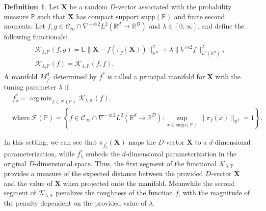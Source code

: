 \documentclass[11pt,reqno]{article}
\DeclareMathOperator*{\argmin}{arg\,min}
\theoremstyle{definition}
\newtheorem{definition}{Definition}
\begin{document}
\begin{definition}
  \label{def:principal_manifolds}
  Let $\boldsymbol{X}$ be a random $D$-vector associated with the probability measure $\mathbb{P}$ such that $\boldsymbol{X}$ has compact support $\text{supp}(\mathbb{P})$ and finite second moments. Let $f, g \in \mathcal{C}_{\infty}\cap \nabla^{-\otimes 2}L^2(\mathbb{R}^{d} \to \mathbb{R}^{D})$ and $\lambda \in [0, \infty]$, and define the following functionals:
  \begin{align}\label{eq:5}
    \begin{aligned}
&\mathcal{K}_{\lambda, \mathbb{P}}(f, g) = \mathbb{E}\|\boldsymbol{X} - f(\pi_g(\boldsymbol{X}))\|_{\mathbb{R}^{D}}^2 + \lambda\|\nabla^{\otimes 2}f\|_{L^2(\mathbb{R}^{d})}^2, \\
&\mathcal{K}_{\lambda, \mathbb{P}}(f) = \mathcal{K}_{\lambda, \mathbb{P}}(f, f).
    \end{aligned}
  \end{align}
  A manifold $M_{f^{*}}^{d}$ determined by $f^{*}$ is called a principal manifold for $\boldsymbol{X}$ with the tuning parameter $\lambda$ if 
  \begin{equation}\label{eq:7}
    \begin{aligned}
        & f_{\lambda}^{*} = \argmin_{f \in \mathcal{F}(\mathbb{P})}\mathcal{K}_{\lambda, \mathbb{P}}(f), \\ 
    &\text{where} \ \mathcal{F}(\mathbb{P}) = \left\{f \in \mathcal{C}_{\infty} \cap \nabla^{-\otimes 2}L^2(\mathbb{R}^{d} \to \mathbb{R}^{D}): \sup_{x \in \text{supp}(\mathbb{P})}\|\pi_f(x)\|_{\mathbb{R}^{d}} = 1\right\}. 
    \end{aligned}
  \end{equation}
\end{definition}
In this setting, we can see that $\pi_{f_{\lambda}^{*}}(\boldsymbol{X})$ maps the $D$-vector $\boldsymbol{X}$ to a $d$-dimensional parameterization, while $f_{\lambda}^{*}$ embeds the $d$-dimensional parameterization in the original $D$-dimensional space. Thus, the first segment of the functional $\mathcal{K}_{\lambda, \mathbb{P}}$ provides a measure of the expected distance between the provided $D$-vector $\mathbf{X}$ and the value of $\mathbf{X}$ when projected onto the manifold. Meanwhile the second segment of $\mathcal{K}_{\lambda, \mathbb{P}}$ penalizes the roughness of the function $f$, with the magnitude of the penalty dependent on the provided value of $\lambda$.
\end{document}

